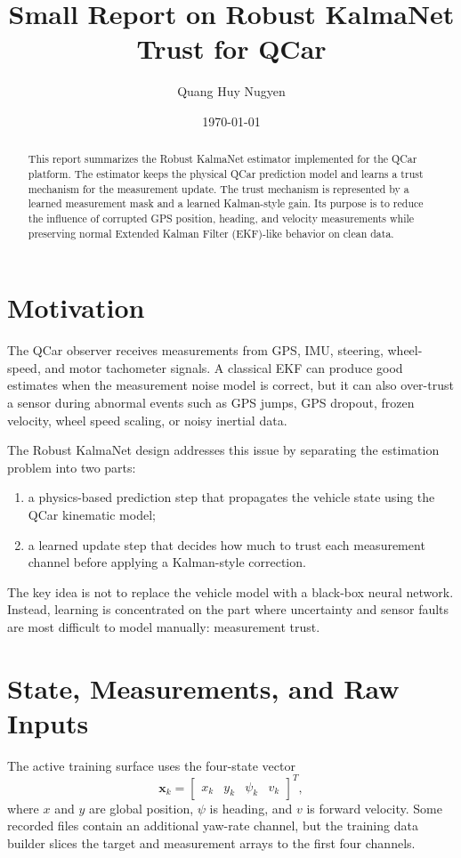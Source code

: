 \documentclass[11pt,a4paper]{article}
\title{Small Report on Robust KalmaNet Trust for QCar}
\author{Quang Huy Nugyen}
\date{\today}
\newcommand{\state}{\bm{x}}
\begin{document}
\maketitle

\begin{abstract}
This report summarizes the Robust KalmaNet estimator implemented for the QCar
platform. The estimator keeps the physical QCar prediction model and learns a
trust mechanism for the measurement update. The trust mechanism is represented
by a learned measurement mask and a learned Kalman-style gain. Its purpose is to
reduce the influence of corrupted GPS position, heading, and velocity
measurements while preserving normal Extended Kalman Filter (EKF)-like behavior
on clean data.
\end{abstract}

\section{Motivation}

The QCar observer receives measurements from GPS, IMU, steering, wheel-speed,
and motor tachometer signals. A classical EKF can produce good estimates when
the measurement noise model is correct, but it can also over-trust a sensor
during abnormal events such as GPS jumps, GPS dropout, frozen velocity, wheel
speed scaling, or noisy inertial data.

The Robust KalmaNet design addresses this issue by separating the estimation
problem into two parts:
\begin{enumerate}
  \item a physics-based prediction step that propagates the vehicle state using
  the QCar kinematic model;
  \item a learned update step that decides how much to trust each measurement
  channel before applying a Kalman-style correction.
\end{enumerate}

The key idea is not to replace the vehicle model with a black-box neural
network. Instead, learning is concentrated on the part where uncertainty and
sensor faults are most difficult to model manually: measurement trust.

\section{State, Measurements, and Raw Inputs}

The active training surface uses the four-state vector
\begin{equation}
  \state_k =
  \begin{bmatrix}
    x_k & y_k & \psi_k & v_k
  \end{bmatrix}^{T},
\end{equation}
where $x$ and $y$ are global position, $\psi$ is heading, and $v$ is forward
velocity. Some recorded files contain an additional yaw-rate channel, but the
training data builder slices the target and measurement arrays to the first
four channels.
\end{document}
